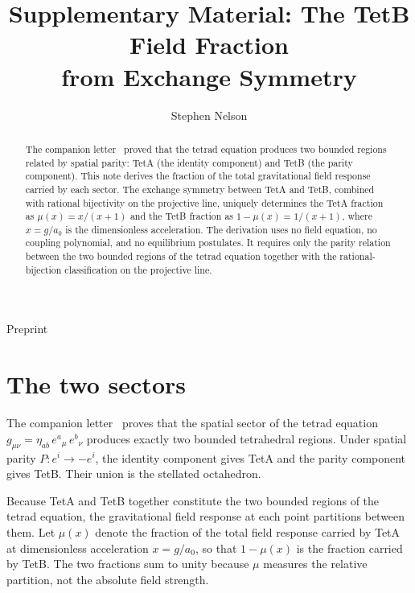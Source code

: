 \documentclass[twocolumn]{iopjournal}
\renewcommand{\articletype}[1]{%
  {\vspace*{-8mm}\noindent \Large \sf Preprint}\par
  \vspace*{6mm}\noindent{\scriptsize \sf{\bfseries \MakeUppercase{#1}}}}
\begin{document}
\articletype{Supplementary Material}

\title{Supplementary Material: The TetB Field Fraction\\
from Exchange Symmetry}

\author{Stephen Nelson}



\begin{abstract}
The companion letter~\cite{Nelson2026a} proved that the tetrad
equation produces two bounded regions related by spatial parity:
TetA (the identity component) and TetB (the parity component).
This note derives the fraction of the total gravitational field
response carried by each sector. The exchange symmetry between
TetA and TetB, combined with rational bijectivity on the
projective line, uniquely determines the TetA fraction as
$\mu(x) = x/(x+1)$ and the TetB fraction as
$1 - \mu(x) = 1/(x+1)$, where $x = g/a_0$ is the
dimensionless acceleration. The derivation uses no field
equation, no coupling polynomial, and no equilibrium
postulates. It requires only the parity relation between the
two bounded regions of the tetrad equation together with the
rational-bijection classification on the projective line.
\end{abstract}


\section*{The two sectors}

The companion letter~\cite{Nelson2026a} proves that the
spatial sector of the tetrad equation
$g_{\mu\nu} = \eta_{ab}\,e^a{}_\mu\,e^b{}_\nu$ produces
exactly two bounded tetrahedral regions. Under spatial parity
$P: e^i \to -e^i$, the identity component gives TetA and the
parity component gives TetB. Their union is the stellated
octahedron.

Because TetA and TetB together constitute the two bounded
regions of the tetrad equation, the gravitational field
response at each point partitions between them. Let $\mu(x)$
denote the fraction of the total field response carried by
TetA at dimensionless acceleration $x = g/a_0$, so that
$1 - \mu(x)$ is the fraction carried by TetB. The two fractions
sum to
unity because $\mu$ measures the relative partition, not the
absolute field strength.
\end{document}
